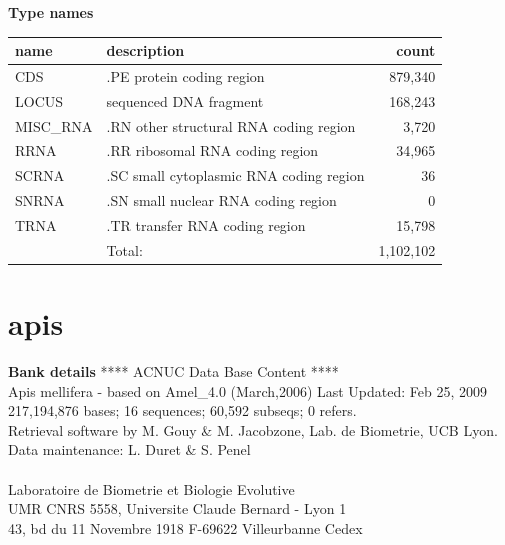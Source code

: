 \documentclass{article}
\begin{document}
\begin{Schunk}
\textbf{Type names}
\noindent\begin{tabular}{llr}
\hline \hline
name & description & count \\
\hline
CDS  &  .PE protein coding region  &  879,340 \\
LOCUS  &  sequenced DNA fragment  &  168,243 \\
MISC\_RNA  &  .RN other structural RNA coding region  &  3,720 \\
RRNA  &  .RR ribosomal RNA coding region  &  34,965 \\
SCRNA  &  .SC small cytoplasmic RNA coding region  &  36 \\
SNRNA  &  .SN small nuclear RNA coding region  &  0 \\
TRNA  &  .TR transfer RNA coding region  &  15,798 \\
\hline
 & Total: & 1,102,102 \\
\hline \hline
\end{tabular}

\section{ apis }
\textbf{Bank details}
               ****     ACNUC Data Base Content      ****                      \\
  Apis mellifera - based on Amel\_4.0 (March,2006) Last Updated: Feb 25, 2009\\
   217,194,876 bases; 16 sequences; 60,592 subseqs; 0 refers.\\
  Retrieval software by M. Gouy \& M. Jacobzone, Lab. de Biometrie, UCB Lyon.\\
                 Data maintenance: L. Duret \& S. Penel\\
\\
          Laboratoire de Biometrie et Biologie Evolutive\\
         UMR CNRS 5558, Universite Claude Bernard - Lyon 1 \\
       43, bd du 11 Novembre 1918 F-69622 Villeurbanne Cedex\\



\end{Schunk}
\end{document}
